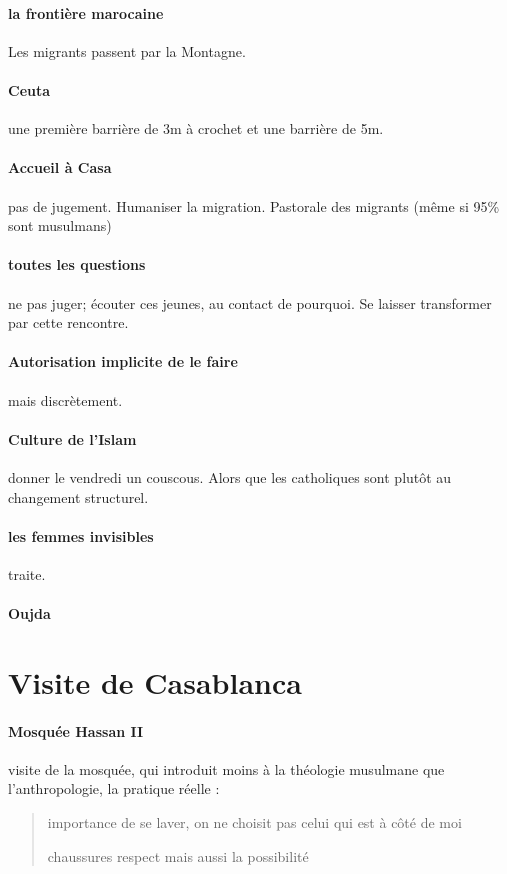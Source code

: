 \paragraph{la frontière marocaine}
Les migrants passent par la Montagne.

\paragraph{Ceuta} une première barrière de 3m à crochet et une barrière de 5m.

\paragraph{Accueil à Casa} pas de jugement. Humaniser la migration. Pastorale des migrants (même si 95\% sont musulmans)

\paragraph{toutes les questions} ne pas juger; écouter ces jeunes, au contact de pourquoi. Se laisser transformer par cette rencontre.

\paragraph{Autorisation implicite de le faire} mais discrètement. 

\paragraph{Culture de l'Islam} donner le vendredi un couscous. Alors que les catholiques sont plutôt au changement structurel.

\paragraph{les femmes invisibles} traite. 

\paragraph{Oujda}


\section{Visite de Casablanca}

\paragraph{Mosquée Hassan II}
visite de la mosquée, qui introduit moins à la théologie musulmane que l'anthropologie, la pratique réelle : 
\begin{quote}
\item importance de se laver, on ne choisit pas celui qui est à côté de moi
\item  chaussures respect mais aussi la possibilité     
\end{quote}

